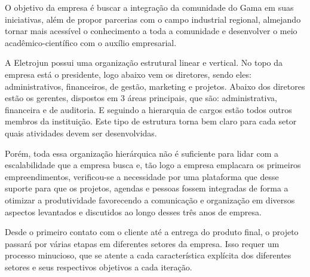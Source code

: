 O objetivo da empresa é buscar a integração da comunidade do Gama em suas iniciativas, além de propor parcerias com o campo industrial regional, almejando tornar mais acessível o conhecimento a toda a comunidade e desenvolver o meio acadêmico-científico com o auxílio empresarial.
    
A Eletrojun possui uma organização estrutural linear e vertical. No topo da empresa está o presidente, logo abaixo vem os diretores, sendo eles: administrativos, financeiros, de gestão, marketing e projetos. Abaixo dos diretores estão os gerentes, dispostos em 3 áreas principais, que são: administrativa, financeira e de auditoria. E seguindo a hierarquia de cargos estão todos outros membros da instituição. Este tipo de estrutura torna bem claro para cada setor quais atividades devem ser desenvolvidas.

Porém, toda essa organização hierárquica não é suficiente para lidar com a escalabilidade que a empresa busca e, tão logo a empresa emplacara os primeiros empreendimentos, verificou-se a necessidade por uma plataforma que desse suporte para que os projetos, agendas e pessoas fossem integradas de forma a otimizar a produtividade favorecendo a comunicação e organização em diversos aspectos levantados e discutidos ao longo desses três anos de empresa.

Desde o primeiro contato com o cliente até a entrega do produto final, o projeto passará por várias etapas em diferentes setores da empresa. Isso requer um processo minucioso, que se atente a cada característica explícita dos diferentes setores e seus respectivos objetivos a cada iteração.
